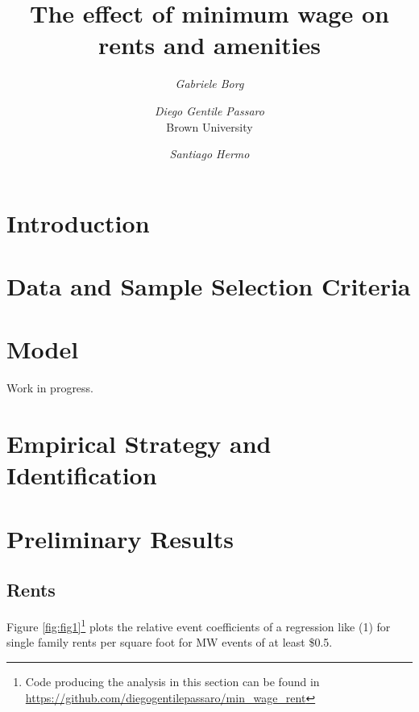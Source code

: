 \documentclass{article}
\title{The effect of minimum wage on rents and amenities}
\author{\textit{Gabriele Borg} \and
    \textit{Diego Gentile Passaro} \\	\small Brown University
    \and \textit{Santiago Hermo}}
\begin{document}
	\maketitle
	
\section{Introduction}\label{sec:intro}


 \section{Data and Sample Selection Criteria}\label{sec:data}


\section{Model}\label{sec:model}

Work in progress. 

\section{Empirical Strategy and Identification}\label{sec:empirical_strategy}


\section{Preliminary Results}\label{sec:results}

\subsection{Rents}

Figure \ref{fig:fig1}\footnote{Code producing the analysis in this section can be found in \url{https://github.com/diegogentilepassaro/min_wage_rent}} plots the relative event coefficients of a regression like (1) for single family rents per square foot for MW events of at least \$0.5. 
\end{document}
